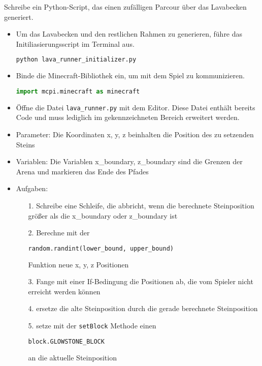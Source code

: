 \large Schreibe ein Python-Script, das einen zufälligen Parcour über das Lavabecken generiert.
\begin{itemize}
	\item Um das Lavabecken und den restlichen Rahmen zu generieren, führe das Initiliasierungsscript im Terminal aus.
	\begin{lstlisting}[language=sh]
python lava_runner_initializer.py
	\end{lstlisting}
	\item Binde die Minecraft-Bibliothek ein, um mit dem Spiel zu kommunizieren.
	\begin{lstlisting}[language=Python]
import mcpi.minecraft as minecraft
	\end{lstlisting}
	
	\item Öffne die Datei \texttt{lava\_runner.py} mit dem Editor. Diese Datei enthält bereits Code und muss lediglich im gekennzeichneten Bereich erweitert werden.
	
	\item Parameter: Die Koordinaten x, y, z beinhalten die Position des zu setzenden Steins
	\item Variablen: Die Variablen x\_boundary, z\_boundary sind die Grenzen der Arena und markieren das Ende des Pfades
	\item Aufgaben:
	\begin{itemize}
		\item[1.] Schreibe eine Schleife, die abbricht, wenn die berechnete Steinposition größer als die x\_boundary oder z\_boundary ist
		\item[2.] Berechne mit der \begin{lstlisting}[language=Python]
		random.randint(lower_bound, upper_bound)
		\end{lstlisting} Funktion neue x, y, z Positionen
		\item[3.] Fange mit einer If-Bedingung die Positionen ab, die vom Spieler nicht erreicht werden können
		\item[4.] ersetze die alte Steinposition durch die gerade berechnete Steinposition
		\item[5.] setze mit der \texttt{setBlock} Methode einen \begin{lstlisting}[language=Python]
		block.GLOWSTONE_BLOCK
		\end{lstlisting} an die aktuelle Steinposition
	\end{itemize}
\end{itemize}